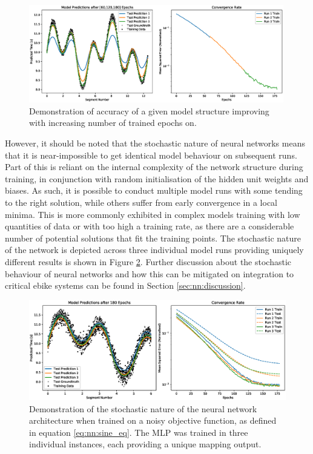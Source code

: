 \documentclass[a4paper, 10pt]{article}
\numberwithin{equation}{section}
\begin{document}
\begin{figure}[H]
    \centering
    \includegraphics[width=0.99\textwidth]{images/NN_ANN/sine_epochs.eps}
    \caption{Demonstration of accuracy of a given model structure improving with increasing number of trained epochs on.}
    \label{fig:nn:sine_epochs}
\end{figure}

However, it should be noted that the stochastic nature of neural networks means that it is near-impossible to get identical model behaviour on subsequent runs. Part of this is reliant on the internal complexity of the network structure during training, in conjunction with random initialisation of the hidden unit weights and biases. As such, it is possible to conduct multiple model runs with some tending to the right solution, while others suffer from early convergence in a local minima. This is more commonly exhibited in complex models training with low quantities of data or with too high a training rate, as there are a considerable number of potential solutions that fit the training points. The stochastic nature of the network is depicted across three individual model runs providing uniquely different results is shown in Figure \ref{fig:nn:sine_stochastic}. Further discussion about the stochastic behaviour of neural networks and how this can be mitigated on integration to critical ebike systems can be found in Section \ref{sec:nn:discussion}.

\begin{figure}[H]
    \centering
    \includegraphics[width=\textwidth]{images/NN_ANN/sine_stochastic.eps}
    \caption{Demonstration of the stochastic nature of the neural network architecture when trained on a noisy objective function, as defined in equation \ref{eq:nn:sine_eq}. The MLP was trained in three individual instances, each providing a unique mapping output.}
    \label{fig:nn:sine_stochastic}
\end{figure}
\end{document}

